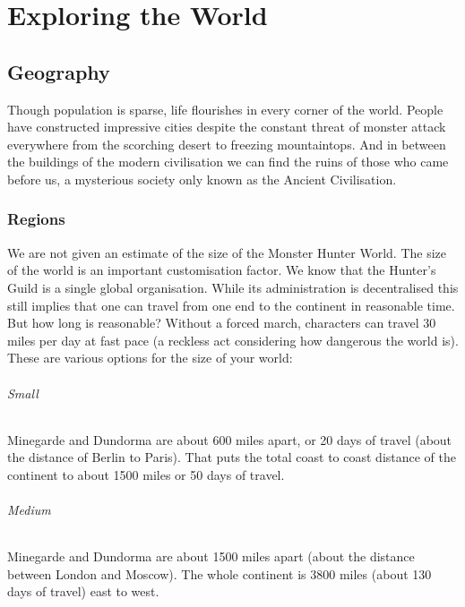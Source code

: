 \renewcommand*{\hbPartCover}{assets/ext/world-cover}
\renewcommand*{\hbPartSubcover}{assets/ext/world-cover2}

\part{Exploring the World}

\chapter{Geography}


Though population is sparse, life flourishes in every corner of the world. People have constructed impressive cities despite the constant threat of monster attack everywhere from the scorching desert to freezing mountaintops. And in between the buildings of the modern civilisation we can find the ruins of those who came before us, a mysterious society only known as the Ancient Civilisation.

\section{Regions}
We are not given an estimate of the size of the Monster Hunter World. The size of the world is an important customisation factor. We know that the Hunter's Guild is a single global organisation. While its administration is decentralised this still implies that one can travel from one end to the continent in reasonable time. But how long is reasonable? Without a forced march, characters can travel 30 miles per day at fast pace (a reckless act considering how dangerous the world is). These are various options for the size of your world:

\paragraph{Small} Minegarde and Dundorma are about 600 miles apart, or 20 days of travel (about the distance of Berlin to Paris). That puts the total coast to coast distance of the continent to about 1500 miles or 50 days of travel.

\paragraph{Medium} Minegarde and Dundorma are about 1500 miles apart (about the distance between London and Moscow). The whole continent is 3800 miles (about 130 days of travel) east to west.

